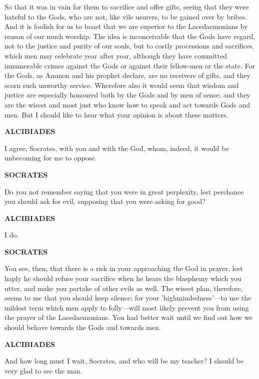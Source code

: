 \documentclass[11pt,letter]{article}
\begin{document}
\par  So that it was in vain for them to sacrifice and offer gifts, seeing that they were hateful to the Gods, who are not, like vile usurers, to be gained over by bribes. And it is foolish for us to boast that we are superior to the Lacedaemonians by reason of our much worship. The idea is inconceivable that the Gods have regard, not to the justice and purity of our souls, but to costly processions and sacrifices, which men may celebrate year after year, although they have committed innumerable crimes against the Gods or against their fellow-men or the state. For the Gods, as Ammon and his prophet declare, are no receivers of gifts, and they scorn such unworthy service. Wherefore also it would seem that wisdom and justice are especially honoured both by the Gods and by men of sense; and they are the wisest and most just who know how to speak and act towards Gods and men. But I should like to hear what your opinion is about these matters.

\par \textbf{ALCIBIADES}
\par   I agree, Socrates, with you and with the God, whom, indeed, it would be unbecoming for me to oppose.

\par \textbf{SOCRATES}
\par   Do you not remember saying that you were in great perplexity, lest perchance you should ask for evil, supposing that you were asking for good?

\par \textbf{ALCIBIADES}
\par   I do.

\par \textbf{SOCRATES}
\par   You see, then, that there is a risk in your approaching the God in prayer, lest haply he should refuse your sacrifice when he hears the blasphemy which you utter, and make you partake of other evils as well. The wisest plan, therefore, seems to me that you should keep silence; for your 'highmindedness'—to use the mildest term which men apply to folly—will most likely prevent you from using the prayer of the Lacedaemonians. You had better wait until we find out how we should behave towards the Gods and towards men.

\par \textbf{ALCIBIADES}
\par   And how long must I wait, Socrates, and who will be my teacher? I should be very glad to see the man.
\end{document}
